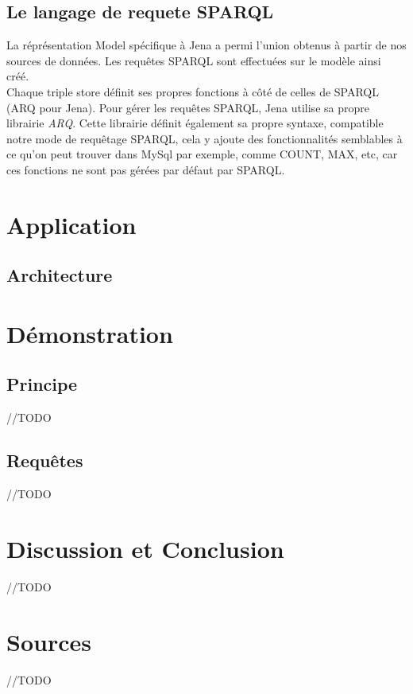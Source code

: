 \documentclass{article}
\begin{document}
\subsection{Le langage de requete SPARQL}
La réprésentation Model spécifique à Jena a permi l'union obtenus à partir de nos sources de données. Les requêtes SPARQL sont effectuées sur le modèle ainsi créé.\\
Chaque triple store définit ses propres fonctions à côté de celles de SPARQL (ARQ pour Jena). Pour gérer les requêtes SPARQL, Jena utilise sa propre librairie \textit{ARQ}. Cette librairie définit également sa propre syntaxe, compatible notre mode de requêtage SPARQL, cela y ajoute des fonctionnalités semblables à ce qu'on peut trouver dans MySql par exemple, comme COUNT, MAX, etc, car ces fonctions ne sont pas gérées par défaut par SPARQL.



\section{Application}
\subsection{Architecture}


\section{Démonstration}

\subsection{Principe}
//TODO

\subsection{Requêtes}

//TODO


\section{Discussion et Conclusion }
//TODO


\section{Sources}

//TODO

\end{document}
